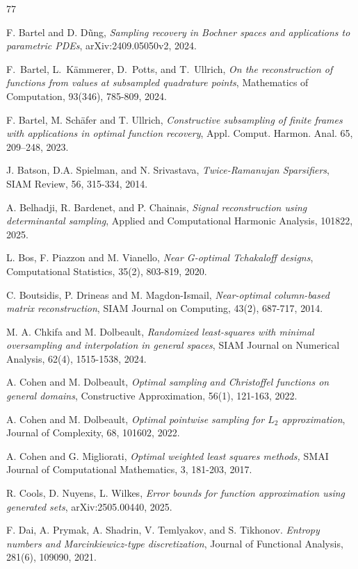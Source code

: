 \documentclass[a4paper,11pt]{article}
\renewcommand{\(}{\left (}
\renewcommand{\)}{\right )}
\newcommand{\<}{\langle}
\renewcommand{\>}{\rangle}
\theoremstyle{definition}
\begin{document}
\begin{thebibliography}{77}

F. Bartel and D. D\~ung,
{\it Sampling recovery in Bochner spaces and applications to parametric PDEs},
 arXiv:2409.05050v2, 2024.

F.~Bartel, L.~Kämmerer, D.~Potts, and T.~Ullrich, \emph{On the reconstruction of functions from values at subsampled quadrature points},
Mathematics of Computation, 93(346), 785-809, 2024.

 F. Bartel, M. Sch\"afer and T. Ullrich, {\it Constructive subsampling of finite frames with applications in optimal function recovery}, 
Appl. Comput. Harmon. Anal. 65, 209--248, 2023.

 J. Batson, D.A. Spielman, and N. Srivastava, {\it Twice-Ramanujan Sparsifiers}, SIAM Review, 56, 315-334, 2014.

A. Belhadji, R. Bardenet, and P. Chainais, {\it Signal reconstruction using determinantal sampling}, Applied and Computational Harmonic Analysis, 101822, 2025.

L. Bos, F. Piazzon and M. Vianello, {\it Near G-optimal Tchakaloff designs}, Computational Statistics, 35(2), 803-819, 2020. 

 C. Boutsidis, P. Drineas and M. Magdon-Ismail, {\it Near-optimal column-based matrix reconstruction}, SIAM Journal on Computing, 43(2), 687-717, 2014.

 M. A. Chkifa and M. Dolbeault, {\it Randomized least-squares with minimal oversampling and interpolation in general spaces}, SIAM Journal on Numerical Analysis, 62(4), 1515-1538, 2024.

 A. Cohen and M. Dolbeault, {\it Optimal sampling and Christoffel functions on general domains}, Constructive Approximation, 56(1), 121-163, 2022.

 A. Cohen and M. Dolbeault, {\it Optimal pointwise sampling for $L_2$ approximation}, Journal of Complexity, 68, 101602, 2022.

 A. Cohen and G. Migliorati, 
\emph{Optimal weighted least squares methods,} SMAI Journal of Computational Mathematics, 3, 181-203, 2017.

 R. Cools, D. Nuyens, L. Wilkes, 
{\it Error bounds for function approximation using generated sets}, arXiv:2505.00440, 2025.

F. Dai, A. Prymak, A. Shadrin, V. Temlyakov, and S. Tikhonov.
\emph{Entropy numbers and Marcinkiewicz-type discretization},
Journal of Functional Analysis, 281(6), 109090, 2021.


\end{thebibliography}
\end{document}
